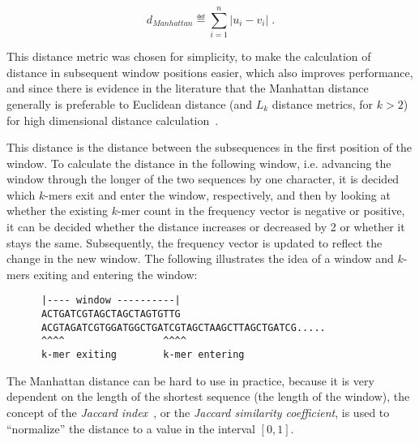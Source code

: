 \begin{equation}
  d_{Manhattan} \eqdef \sum_{i=1}^{n} |u_i - v_i| \;.
\end{equation}

This distance metric was chosen for simplicity, to make the calculation of
distance in subsequent window positions easier, which also improves
performance, and since there is evidence in the literature that the Manhattan
distance generally is preferable to Euclidean distance (and $L_k$ distance
metrics, for $k>2$) for high dimensional distance calculation~\cite{aggarwal}.

This distance is the distance between the subsequences in the first position of
the window. To calculate the distance in the following window, i.e. advancing
the window through the longer of the two sequences by one character, it is
decided which $k$-mers exit and enter the window, respectively, and then by
looking at whether the existing $k$-mer count in the frequency vector is
negative or positive, it can be decided whether the distance increases or
decreased by 2 or whether it stays the same. Subsequently, the frequency vector
is updated to reflect the change in the new window. The following illustrates
the idea of a window and $k$-mers exiting and entering the window:


\begin{verbatim}
      |---- window ----------|
      ACTGATCGTAGCTAGCTAGTGTTG
      ACGTAGATCGTGGATGGCTGATCGTAGCTAAGCTTAGCTGATCG.....
      ^^^^                 ^^^^
      k-mer exiting        k-mer entering
\end{verbatim}

The Manhattan distance can be hard to use in practice, because it is very
dependent on the length of the shortest sequence (the length of the window),
the concept of the \emph{Jaccard index}~\cite{jaccard1901,jaccard1912}, or the
\emph{Jaccard similarity coefficient}, is used to ``normalize'' the distance to
a value in the interval $[0,1]$.

